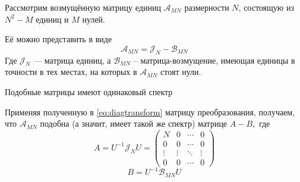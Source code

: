 Рассмотрим возмущённую матрицу единиц
\( \mathscr{A}_{MN} \) размерности \( N \),
состоящую из \( N^2 - M \) единиц и \( M \) нулей.

Её можно представить в виде
\[
    \mathscr{A}_{MN} = \mathscr{J}_{N} - \mathscr{B}_{MN}
    \]
Где \( \mathscr{J}_{N} \) --- матрица единиц,
а \( \mathscr{B}_{MN} \) -- матрица-возмущение,
имеющая единицы в точности в тех местах,
на которых в \( \mathscr{A}_{MN} \) стоят нули.

\begin{prop}
    Подобные матрицы имеют одинаковый спектр
\end{prop}

Применяя полученную в \eqref{eq:diagtransform} матрицу преобразования,
получаем, что \( \mathscr{A}_{MN} \) подобна (а значит, имеет такой же спектр)
матрице
\( A - B, \)
где
\[
    A = {U^{-1}}{\mathscr{J}_{N}}{U}
    = \begin{pmatrix}
      N      & 0      & \cdots & 0 \\
      0      & 0      & \cdots & 0 \\
      \vdots & \vdots & \ddots & \vdots \\
      0      & 0      & \cdots & 0
        \end{pmatrix}
        \]
\[
    B = {U^{-1}}{\mathscr{B}_{MN}}{U}
    \]
